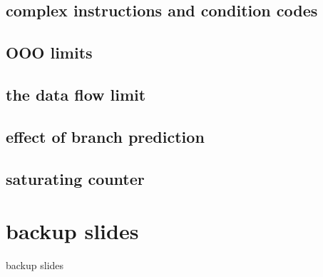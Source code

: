\subsection{complex instructions and condition codes}


\subsection{OOO limits}


\subsection{the data flow limit}


\subsection{effect of branch prediction}




\subsection{saturating counter}




\section{backup slides}
\begin{frame}{backup slides}
\end{frame}





